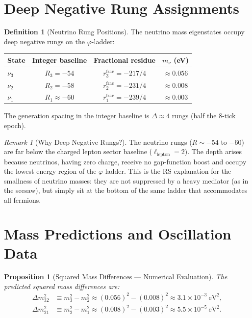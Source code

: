 \documentclass[12pt,a4paper]{article}
\newtheorem{proposition}[theorem]{Proposition}
\theoremstyle{definition}
\newtheorem{definition}[theorem]{Definition}
\theoremstyle{remark}
\newtheorem{remark}[theorem]{Remark}
\begin{document}
\section{Deep Negative Rung Assignments}
\label{sec:rungs}

\begin{definition}[Neutrino Rung Positions]
\label{def:rungs}
The neutrino mass eigenstates occupy deep negative rungs on
the $\varphi$-ladder:
\begin{center}
\renewcommand{\arraystretch}{1.3}
\begin{tabular}{@{}lccc@{}}
\toprule
\textbf{State} & \textbf{Integer baseline} &
\textbf{Fractional residue} &
\textbf{$m_\nu$ (eV)} \\
\midrule
$\nu_3$ & $R_3 = -54$ & $r_3^{\mathrm{frac}} = -217/4$
& $\approx 0.056$ \\
$\nu_2$ & $R_2 = -58$ & $r_2^{\mathrm{frac}} = -231/4$
& $\approx 0.008$ \\
$\nu_1$ & $R_1 \approx -60$ & $r_1^{\mathrm{frac}} = -239/4$
& $\approx 0.003$ \\
\bottomrule
\end{tabular}
\end{center}
The generation spacing in the integer baseline is
$\Delta \approx 4$ rungs (half the 8-tick epoch).
\end{definition}

\begin{remark}[Why Deep Negative Rungs?]
The neutrino rungs ($R \sim -54$ to $-60$) are far below the
charged lepton sector baseline ($\ell_{\mathrm{lepton}} = 2$).
The depth arises because neutrinos, having zero charge, receive
no gap-function boost and occupy the lowest-energy region of the
$\varphi$-ladder.  This is the RS explanation for the smallness
of neutrino masses: they are not suppressed by a heavy mediator
(as in the seesaw), but simply sit at the bottom of the same
ladder that accommodates all fermions.
\end{remark}

\section{Mass Predictions and Oscillation Data}
\label{sec:predictions-data}

\begin{proposition}[Squared Mass Differences --- Numerical Evaluation]
\label{thm:splittings}
The predicted squared mass differences are:
\begin{align}
  \Delta m^2_{32} &\equiv m_3^2 - m_2^2
  \approx (0.056)^2 - (0.008)^2
  \approx 3.1 \times 10^{-3}~\mathrm{eV}^2,
  \label{eq:dm32} \\
  \Delta m^2_{21} &\equiv m_2^2 - m_1^2
  \approx (0.008)^2 - (0.003)^2
  \approx 5.5 \times 10^{-5}~\mathrm{eV}^2.
  \label{eq:dm21}
\end{align}
\end{proposition}
\end{document}
